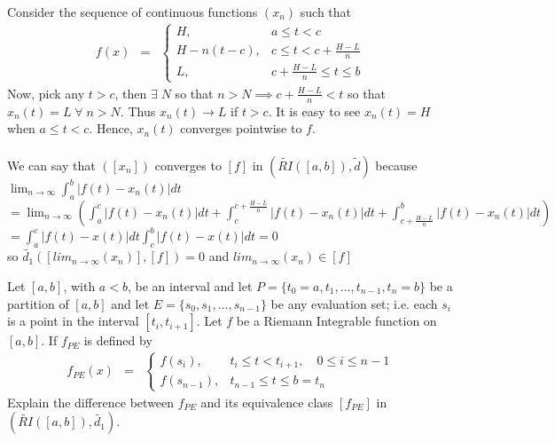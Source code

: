 \documentclass[11pt]{SelfArxOneColBMN}
\begin{document}
\begin{solution}
	Consider the sequence of continuous functions $(x_n)$ such that
	\begin{eqnarray*}
		f(x) &=&
		\left \{
			\begin{array}{ll}
				H, & a \leq t < c\\
				H - n(t -c), & c \leq t < c + \frac{H - L}{n}\\
				L, & c +\frac{H - L}{n} \leq t \leq b
			\end{array}
		\right .
	\end{eqnarray*}
\noindent Now, pick any $t > c$, then $\exists \; N$ so that $n > N \implies c + \frac{H - L}{n} < t$ so that $x_n(t) = L \; \forall \; n > N$. Thus $x_n(t) \rightarrow L$ if $t > c$. It is easy to see $x_n(t) = H$ when $a \leq t < c$. Hence, $x_n(t)$ converges pointwise to $f$.\\
\\We can say that $([x_n])$ converges to $[f]$ in $(\widetilde{RI}([a,b]),\widetilde{d})$ because $\lim_{n \rightarrow \infty}\int_a^b|f(t) - x_n(t)|dt$\\
$= \lim_{n \rightarrow \infty}(\int_a^c|f(t) - x_n(t)|dt + \int_c^{c + \frac{H - L}{n}}|f(t) - x_n(t)|dt + \int_{c + \frac{H - L}{n}}^b|f(t) - x_n(t)|dt)$\\
$= \int_a^c|f(t) - x(t)|dt \int_c^b|f(t) - x(t)|dt = 0$\\
	so $\widetilde{d_1}([lim_{n \rightarrow \infty}(x_n)], [f]) = 0$ and $lim_{n \rightarrow \infty}(x_n) \in [f]$
\end{solution}

\begin{exercise}
Let $[a,b]$, with $a < b$, be an interval and let 
$P = \{t_0 = a, t_1, \ldots, t_{n-1}, t_n = b\}$
be a partition of $[a,b]$ and let
$E = \{s_0,s_1, \ldots, s_{n-1}\}$
be any evaluation set; i.e. each $s_i$ is a point in the
interval $[t_i, t_{i+1}]$.  Let $f$ be a Riemann Integrable function on
$[a,b]$.
If $f_{PE}$ is defined by
\begin{eqnarray*}
f_{PE}(x) &=&
\left \{
\begin{array}{ll}
f(s_i), & t_i \leq t < t_{i+1}, \quad 0 \leq i \leq n-1\\
f(s_{n-1}), &  t_{n-1} \leq t \leq b = t_n
\end{array}
\right .
\end{eqnarray*}
\noindent
\noindent
Explain the difference between $f_{PE}$ and its equivalence
class $[f_{PE}]$ in $(\widetilde{RI}([a,b]), \widetilde{d_1})$.
\end{exercise}
\end{document}

